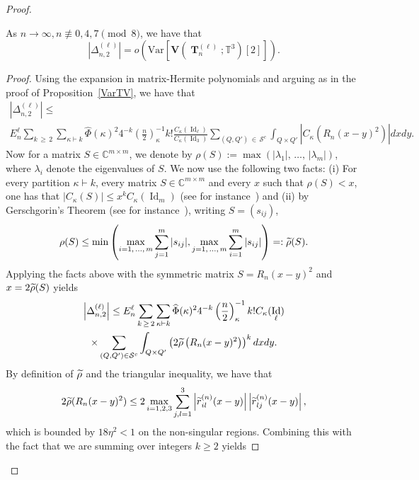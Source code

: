 \documentclass[AHL,Unicode,longabstracts,published]{cedram}
\DeclareMathOperator{\Id}{Id}
\DeclareMathOperator{\bT}{\mathbf{T}}
\newcommand{\bfv}{\mathbf{V}}
\newcommand{\clS}{\mathcal{S}}
\newcommand{\C}{\mathbb{C}}
\newcommand{\T}{\mathbb{T}^3}
\newcommand{\V}[1]{\mathrm{Var}{\left[#1\right]}}
\newcommand{\notcon}[3]{ {#1} \not\equiv {#2} \pmod {#3} }
\let\oldtilde\tilde
\renewcommand*{\tilde}[1]{\mathchoice{\widetilde{#1}}{\widetilde{#1}}{\oldtilde{#1}}{\oldtilde{#1}}}
\begin{document}
\begin{proof}
\begin{lemm}\label{NonSingLemma}
As $n \to \infty, \notcon{n}{0,4,7}{8}$, we have that
\[
\left| \Delta_{n,2}^{(\ell)}\right| = o\left(\V{\bfv\left(\bT_n^{(\ell)};\T\right)[2]}\right).
\]
\end{lemm}
\begin{proof}
Using the expansion in matrix-Hermite polynomials and arguing as in the proof of Proposition~\ref{VarTV}, we have that
\begin{multline*}
\left| \Delta_{n,2}^{(\ell)}\right|
\leq\\
E_n^{\ell}
\sum_{k\,\geq\,2}
\sum_{\kappa \vdash k}
\widehat{\Phi}(\kappa)^2 4^{-k}
\left(\frac{n}{2}\right)^{-1}_{\kappa} k!
\frac{C_{\kappa}(\Id_{\ell})}{C_{\kappa}(\Id_3)}
\sum_{(Q,Q')\,\in\,\clS^c}
\int_{Q\times Q'}
\left| C_{\kappa}\left(R_n(x-y)^2\right) \right| dxdy.
\end{multline*}
Now for a matrix $S \in \C^{m\times m}$, we denote by $\rho(S):=\max(|\lambda_1|,\,\ldots,\,|\lambda_m|)$, where $\lambda_i$ denote the eigenvalues of $S$. We now use the following two facts: (i) For every partition $\kappa\vdash k$, every matrix $S \in \C^{m\times m}$ and every $x$ such that $\rho(S) < x$, one has that $\left|C_{\kappa}(S)\right| \leq x^k C_{\kappa}(\Id_m)$ (see for instance~\cite[p.~197]{BFZP}) and (ii) by Gerschgorin's Theorem (see for instance~\cite[p.~1084]{GR:14}), writing $S=(s_{ij})$,
\[
\rho(S) \leq \min\left(
\max_{i=1,\,\ldots,\,m} \sum_{j=1}^m |s_{ij}|,
\max_{j=1,\,\ldots,\,m}
\sum_{i=1}^m |s_{ij}|
\right)=: \tilde{\rho}(S).
\]
Applying the facts above with the symmetric matrix $S= R_n(x-y)^2$ and $x = 2\tilde{\rho}(S)$ yields
\begin{multline}\label{BoundB1}
\left| \Delta_{n,2}^{(\ell)}\right| \leq E_n^{\ell}
\sum_{k\,\geq\,2}
\sum_{\kappa \vdash k}
\widehat{\Phi}(\kappa)^2 4^{-k}
\left(\frac{n}{2}\right)^{-1}_{\kappa} k! C_{\kappa}(\Id_{\ell})\\
\times \sum_{(Q,Q')\in \clS^c}
\int_{Q\times Q'}
\left(2 \tilde{\rho}\left(R_n(x-y)^2\right) \right)^{k} dxdy.
\end{multline}
By definition of $\tilde{\rho}$ and the triangular inequality, we have that
\begin{equation}\label{tilderho}
2\tilde{\rho}(R_n(x-y)^2)
\leq 2\max_{i=1,2,3}
\sum_{j,l=1}^3
\left| \tilde{r}^{(n)}_{il}(x-y)\right|
\left| \tilde{r}^{(n)}_{lj}(x-y)\right|,
\end{equation}
which is bounded by $18\eta^2<1$ on the non-singular regions. Combining this with the fact that we are summing over integers $k\geq 2$ yields

\end{proof}
\end{proof}
\end{document}
